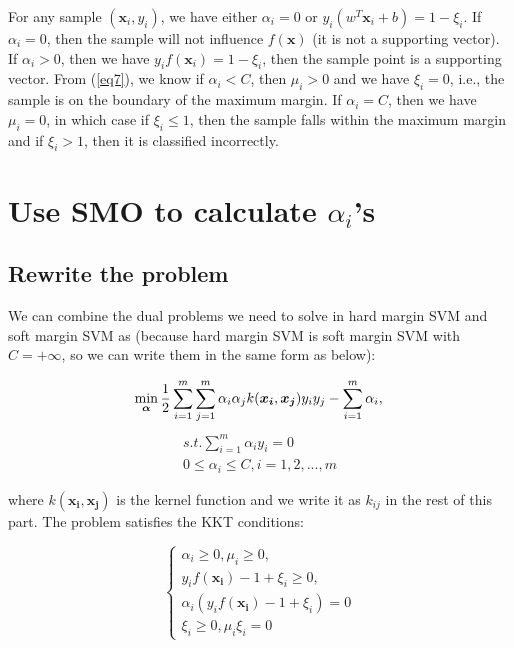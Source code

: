 \documentclass{article}
\begin{document}
For any sample $(\boldsymbol{x}_i, y_i)$, we have either $\alpha_i = 0$ or $y_i(w^T\boldsymbol{x}_i + b) = 1-\xi_i$. If $\alpha_i = 0$, then the sample will not influence $f(\boldsymbol{x})$ (it is not a supporting vector). If $\alpha_i > 0$, then we have $y_if(\boldsymbol{x}_i) = 1-\xi_i$, then the sample point is a supporting vector. From (\ref{eq7}), we know if $\alpha_i < C$, then $\mu_i > 0$ and we have $\xi_i = 0$, i.e., the sample is on the boundary of the maximum margin. If $\alpha_i = C$, then we have $\mu_i = 0$, in which case if $\xi_i \leq 1$, then the sample falls within the maximum margin and if $\xi_i > 1$, then it is classified incorrectly.



\section{Use SMO to calculate $\alpha_i$'s}

\subsection{Rewrite the problem}

We can combine the dual problems we need to solve in hard margin SVM and soft margin SVM as (because hard margin SVM is soft margin SVM with $C=+\infty$, so we can write them in the same form as below):

\begin{equation}
\min_{\boldsymbol{\alpha}} \frac{1}{2}\sum_{i=1}^{m}{\sum_{j=1}^{m}{\alpha_i \alpha_j k(\boldsymbol{x_i}, \boldsymbol{x_j}) y_i y_j}} - \sum_{i=1}^{m}{\alpha_i},  \\
\end{equation}
\begin{gather*}
s.t. \sum_{i=1}^{m}{\alpha_i y_i} = 0 \\
0 \leq \alpha_i \leq C, i=1,2,...,m
\end{gather*}

where $k(\boldsymbol{x_i}, \boldsymbol{x_j})$ is the kernel function and we write it as $k_{ij}$ in the rest of this part. The problem satisfies the KKT conditions:

\begin{equation} \label{eq12}
\begin{cases} \alpha_i \geq 0, \mu_i \geq 0, \\ y_i f(\boldsymbol{x_i}) - 1 + \xi_i \geq 0, \\ \alpha_i (y_i f(\boldsymbol{x_i}) -1 + \xi_i) = 0 \\ \xi_i \geq 0, \mu_i\xi_i = 0 \end{cases}
\end{equation}
\end{document}
